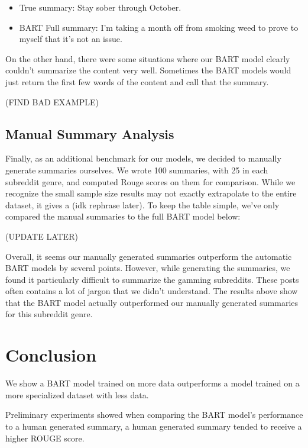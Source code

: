 \documentclass[11pt,a4paper, twocolumn]{article}
\begin{document}
\begin{itemize}
  \item True summary: Stay sober through October.
  \item BART Full summary: I'm taking a month off from smoking weed to prove to myself that it's not an issue.
\end{itemize}


On the other hand, there were some situations where our BART model clearly couldn't summarize the content very well. 
Sometimes the BART models would just return the first few words of the content and call that the summary. 

(FIND BAD EXAMPLE)

\subsection{Manual Summary Analysis}

Finally, as an additional benchmark for our models, we decided to manually generate summaries ourselves. 
We wrote 100 summaries, with 25 in each subreddit genre, and computed Rouge scores on them for comparison. 
While we recognize the small sample size results may not exactly extrapolate to the entire dataset, 
it gives a (idk rephrase later).
To keep the table simple, we've only compared the manual summaries to the full BART model below:

(UPDATE LATER)

Overall, it seems our manually generated summaries outperform the automatic BART models by several points. 
However, while generating the summaries, we found it particularly difficult to summarize the gamming subreddits. 
These posts often contains a lot of jargon that we didn't understand. 
The results above show that the BART model actually outperformed our manually generated summaries for this subreddit genre. 



\section{Conclusion}
We show a BART model trained on more data outperforms a model trained on a more specialized dataset with less data. 

Preliminary experiments showed when comparing the BART model's performance to a human generated summary, a human generated summary tended to receive a higher ROUGE score. 
\end{document}
